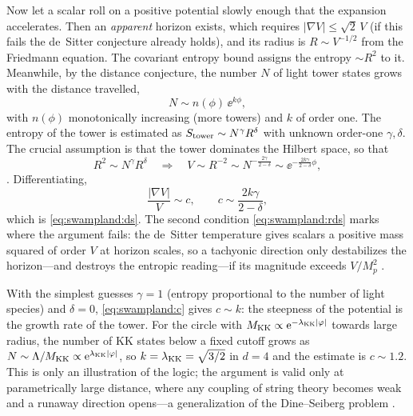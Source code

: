 Now let a scalar roll on a positive potential slowly enough that the expansion accelerates. Then an
\emph{apparent} horizon exists, which requires $|\nabla V|\le\sqrt2\,V$ (if this fails the de~Sitter
conjecture already holds), and its radius is $R\sim V^{-1/2}$ from the Friedmann equation. The
covariant entropy bound assigns the entropy $\sim R^2$ to it. Meanwhile, by the distance
conjecture, the number $N$ of light tower states grows with the distance travelled,
\begin{equation}\label{eq:swampland:N}
N\sim n(\phi)\,\ee^{k\phi},
\end{equation}
with $n(\phi)$ monotonically increasing (more towers) and $k$ of order one. The entropy of the tower
is estimated as $S_{\rm tower}\sim N^\gamma R^\delta$ with unknown order-one $\gamma,\delta$. The
crucial assumption is that the tower dominates the Hilbert space, so that
\begin{equation}\label{eq:swampland:equate}
R^2\sim N^\gamma R^\delta\quad\Longrightarrow\quad
V\sim R^{-2}\sim N^{-\frac{2\gamma}{2-\delta}}\sim\ee^{-\frac{2k\gamma}{2-\delta}\phi} ,
\end{equation}
. Differentiating,
\begin{equation}\label{eq:swampland:c}
\frac{|\nabla V|}{V}\sim c,\qquad c\sim\frac{2k\gamma}{2-\delta} ,
\end{equation}
which is \eqref{eq:swampland:ds}. The second condition \eqref{eq:swampland:rds} marks where the
argument fails: the de~Sitter temperature gives scalars a positive mass squared of order $V$ at
horizon scales, so a tachyonic direction only destabilizes the horizon---and destroys the entropic
reading---if its magnitude exceeds $V/M_p^2$ .

\begin{example}
With the simplest guesses $\gamma=1$ (entropy proportional to the number of light species) and
$\delta=0$, \eqref{eq:swampland:c} gives $c\sim k$: the steepness of the potential is the growth
rate of the tower. For the circle with $M_{\rm KK}\propto\mathrm{e}^{-\lambda_{\rm KK}|\varphi|}$ towards
large radius, the number of KK states below a fixed cutoff grows as $N\sim\Lambda/M_{\rm KK}\propto
\mathrm{e}^{\lambda_{\rm KK}|\varphi|}$, so $k=\lambda_{\rm KK}=\sqrt{3/2}$ in $d=4$ and the estimate is
$c\sim1.2$. This is only an illustration of the logic; the argument is valid only at
parametrically large distance, where any coupling of string theory becomes weak and a runaway
direction opens---a generalization of the Dine--Seiberg problem .
\end{example}

